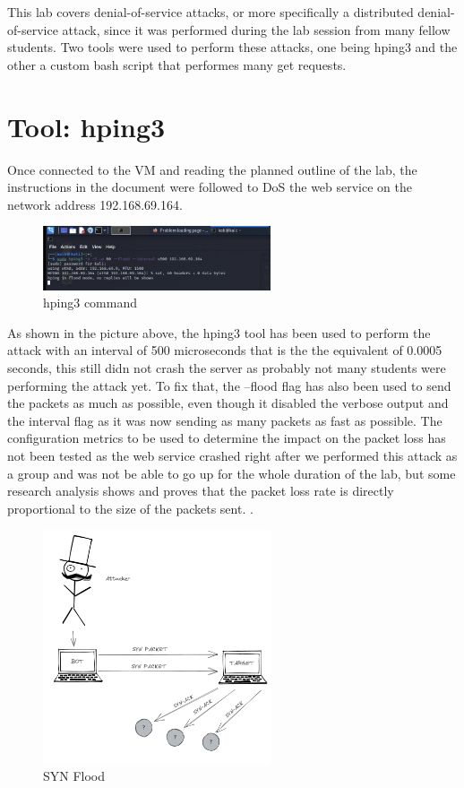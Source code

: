 This lab covers denial-of-service attacks, or more specifically a distributed
denial-of-service attack, since it was performed during the lab session from
many fellow students. Two tools were used to perform these attacks, one being
hping3 and the other a custom bash script that performes many get requests.

\section{Tool: hping3}
\label{s:Tool-hping3}
Once connected to the VM and reading the planned outline of the lab, the
instructions in the document were followed to DoS the web service on the network
address 192.168.69.164.
\begin{figure}[H]
  \centering
  \includegraphics[width=0.6\textwidth]{figures/ddosscommand}
  \caption{hping3 command}
  \label{f:hping3-command}
\end{figure}
As shown in the picture above, the hping3 tool has been used to perform the
attack with an interval of 500 microseconds that is the the equivalent of 0.0005
seconds, this still didn not crash the server as probably not many students were
performing the attack yet. To fix that, the --flood flag has also been used to
send the packets as much as possible, even though it disabled the verbose output
and the interval flag as it was now sending as many packets as fast as possible.
The configuration metrics to be used to determine the impact on the packet loss
has not been tested as the web service crashed right after we performed this
attack as a group and was not be able to go up for the whole duration of the lab,
but some research analysis shows and proves that the packet loss rate is
directly proportional to the size of the packets sent.
\citep{liangDenialServiceAttack2016}.
\begin{figure}[H]
  \centering
  \includegraphics[width=0.6\textwidth]{figures/synflood}
  \caption{SYN Flood}
  \label{f:synflood}
\end{figure}
